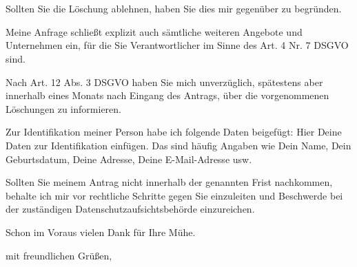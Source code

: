 \documentclass[a4paper, pagenumber=footmiddle, parskip=half,
	foldmarks=true,foldmarks=BmT, fromalign=right,
	fromphone=false, fromfax=false, fromemail=true, fromurl=false, fromlogo=false,
	fromrule=false, version=last]{scrlttr2}
\begin{document}
\begin{letter}{
	\EmpfaengerName\\
	\EmpfaengerStrasse\\
	\EmpfaengerStadt
}
Sollten Sie die Löschung ablehnen, haben Sie dies mir gegenüber zu begründen.

Meine Anfrage schließt explizit auch sämtliche weiteren Angebote und Unternehmen ein, für die Sie Verantwortlicher im Sinne des Art. 4 Nr. 7 DSGVO sind.

Nach Art. 12 Abs. 3 DSGVO haben Sie mich unverzüglich, spätestens aber innerhalb eines Monats nach Eingang des Antrags, über die vorgenommenen Löschungen zu informieren.

Zur Identifikation meiner Person habe ich folgende Daten beigefügt:
Hier Deine Daten zur Identifikation einfügen. Das sind häufig Angaben wie Dein Name, Dein Geburtsdatum, Deine Adresse, Deine E-Mail-Adresse usw.

Sollten Sie meinem Antrag nicht innerhalb der genannten Frist nachkommen, behalte ich mir vor rechtliche Schritte gegen Sie einzuleiten und Beschwerde bei der zuständigen Datenschutzaufsichtsbehörde einzureichen.

Schon im Voraus vielen Dank für Ihre Mühe.


\closing{mit freundlichen Grüßen,}


\end{letter}
\end{document}
